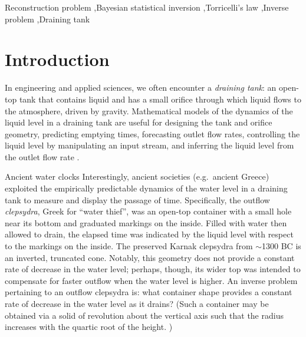 \documentclass[a4paper,fleqn]{cas-dc}
\begin{document}

\begin{keywords}
  Reconstruction problem \sep Bayesian statistical inversion \sep Torricelli's law \sep Inverse problem \sep Draining tank
\end{keywords}

\maketitle


\section{Introduction}
In engineering and applied sciences, we often encounter a \emph{draining tank}:
an open-top tank that contains liquid and has a small orifice through which liquid flows to the atmosphere, driven by gravity.
Mathematical models of the dynamics of the liquid level in a draining tank are useful for designing the tank and orifice geometry, predicting emptying times, forecasting outlet flow rates, controlling the liquid level by manipulating an input stream, and inferring the liquid level from the outlet flow rate \cite{d2021torricelli,seborg2016process,groetsch1993inverse_tl,groetsch1999inverse}.

\begin{mytcbox}[label=box:waterclocks, breakable]{Ancient water clocks}
Interestingly, ancient societies (e.g.\ ancient Greece) exploited the empirically predictable dynamics of the water level in a draining tank to measure and display the passage of time.
Specifically, the outflow \emph{clepsydra}, Greek for ``water thief'', was an open-top container with a small hole near its bottom and graduated markings on the inside. 
Filled with water then allowed to drain, the elapsed time was indicated by the liquid level with respect to the markings on the inside. \cite{bedini1962compartmented,hwang2021historical,ritner2016oriental,hejun1987research,schomberg2018karnak,mills1982newton}
The preserved Karnak clepsydra from $\sim$1300 BC \cite{schomberg2018karnak} is an inverted, truncated cone. Notably, this geometry does not provide a constant rate of decrease in the water level; perhaps, though, its wider top was intended to compensate for faster outflow when the water level is higher. An inverse problem pertaining to an outflow clepsydra is: what container shape provides a constant rate of decrease in the water level as it drains?
(Such a container may be obtained via a solid of revolution about the vertical axis such that the radius increases with the quartic root of the height. \cite{mills1982newton,d2021torricelli})
\end{mytcbox}
\end{document}
